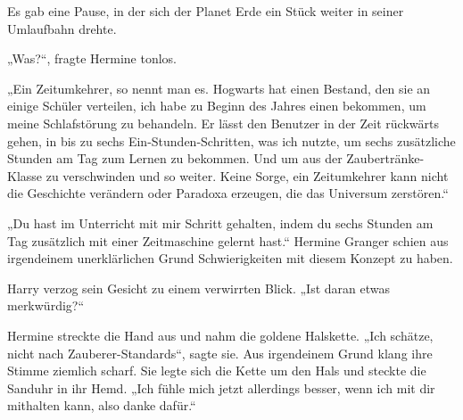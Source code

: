 Es gab eine Pause, in der sich der Planet Erde ein Stück weiter in seiner Umlaufbahn drehte.

„Was?“, fragte Hermine tonlos.

„Ein Zeitumkehrer, so nennt man es. Hogwarts hat einen Bestand, den sie an einige Schüler verteilen, ich habe zu Beginn des Jahres einen bekommen, um meine Schlafstörung zu behandeln. Er lässt den Benutzer in der Zeit rückwärts gehen, in bis zu sechs Ein-Stunden-Schritten, was ich nutzte, um sechs zusätzliche Stunden am Tag zum Lernen zu bekommen. Und um aus der Zaubertränke-Klasse zu verschwinden und so weiter. Keine Sorge, ein Zeitumkehrer kann nicht die Geschichte verändern oder Paradoxa erzeugen, die das Universum zerstören.“

„Du hast im Unterricht mit mir Schritt gehalten, indem du sechs Stunden am Tag zusätzlich mit einer Zeitmaschine gelernt hast.“
Hermine Granger schien aus irgendeinem unerklärlichen Grund Schwierigkeiten mit diesem Konzept zu haben.

Harry verzog sein Gesicht zu einem verwirrten Blick.
„Ist daran etwas merkwürdig?“

Hermine streckte die Hand aus und nahm die goldene Halskette.
„Ich schätze, nicht nach Zauberer-Standards“, sagte sie.
Aus irgendeinem Grund klang ihre Stimme ziemlich scharf.
Sie legte sich die Kette um den Hals und steckte die Sanduhr in ihr Hemd. „Ich fühle mich jetzt allerdings besser, wenn ich mit dir mithalten kann, also danke dafür.“

